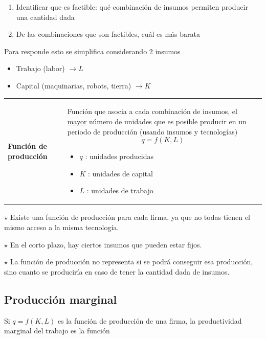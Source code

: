 \documentclass{report}
\newenvironment{obs}{$\star$ }{}
\newenvironment{definition}[1]{\begin{center}
\begin{tabular}{p{3.5cm} p{12.5cm}}
\textbf{#1} &
}
{\\ \end{tabular}\end{center}}
\begin{document}
\begin{enumerate}
\item Identificar que es factible: qué combinación de insumos permiten producir una cantidad dada
\item De las combinaciones que son factibles, cuál es más barata
\end{enumerate}

Para responde esto se simplifica considerando 2 insumos
\begin{itemize}
    \item Trabajo (labor) $\longrightarrow L$
    \item Capital (maquinarias, robots, tierra) $\longrightarrow K$
\end{itemize}

\begin{definition}{Función de producción}
    Función que asocia a cada combinación de insumos, el \underline{mayor} número de unidades que es posible producir en un periodo de producción (usando insumos y tecnologías)
    \[
    q = f\!\left( K, L \right) 
    \] 
    \begin{itemize}
        \item $q$ : unidades producidas
            \item $K$ : unidades de capital
                \item $L$ : unidades de trabajo
    \end{itemize}
\end{definition}

\begin{obs}
    Existe una función de producción para cada firma, ya que no todas tienen el mismo acceso a la misma tecnología.
\end{obs}

\begin{obs}
    En el corto plazo, hay ciertos insumos que pueden estar fijos.
\end{obs}

\begin{obs}
    La función de producción no representa si se podrá conseguir esa producción, sino cuanto se produciría en caso de tener la cantidad dada de insumos.
\end{obs}

\subsection{Producción marginal}

Si $q=f\!\left( K,L \right) $ es la función de producción de una firma, la productividad marginal del trabajo es la función
\end{document}

